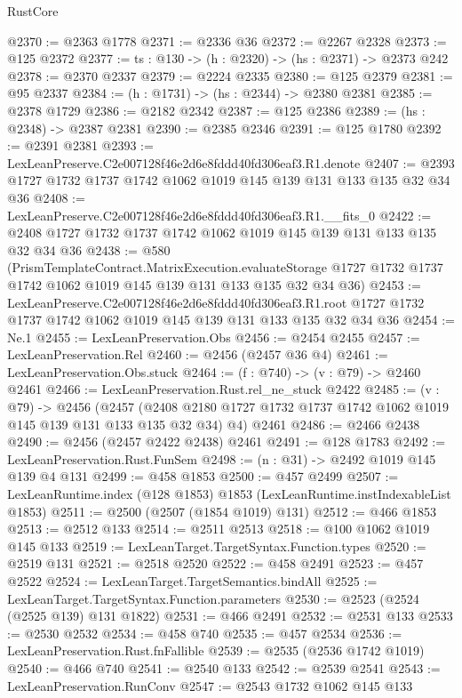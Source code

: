 \begin{lexlean}{RustCore}
\begin{coremodule}
@2370 := @2363 @1778
@2371 := @2336 @36
@2372 := @2267 @2328
@2373 := @125 @2372
@2377 := {ts : @130} -> (h : @2320) -> (hs : @2371) -> @2373 @242
@2378 := @2370 @2337
@2379 := @2224 @2335
@2380 := @125 @2379
@2381 := @95 @2337
@2384 := (h : @1731) -> (hs : @2344) -> @2380 @2381
@2385 := @2378 @1729
@2386 := @2182 @2342
@2387 := @125 @2386
@2389 := (hs : @2348) -> @2387 @2381
@2390 := @2385 @2346
@2391 := @125 @1780
@2392 := @2391 @2381
@2393 := LexLeanPreserve.C2e007128f46e2d6e8fddd40fd306eaf3.R1.denote
@2407 := @2393 @1727 @1732 @1737 @1742 @1062 @1019 @145 @139 @131 @133 @135 @32 @34 @36
@2408 := LexLeanPreserve.C2e007128f46e2d6e8fddd40fd306eaf3.R1.__fits_0
@2422 := @2408 @1727 @1732 @1737 @1742 @1062 @1019 @145 @139 @131 @133 @135 @32 @34 @36
@2438 := @580
    (PrismTemplateContract.MatrixExecution.evaluateStorage
      @1727
      @1732
      @1737
      @1742
      @1062
      @1019
      @145
      @139
      @131
      @133
      @135
      @32
      @34
      @36)
@2453 := LexLeanPreserve.C2e007128f46e2d6e8fddd40fd306eaf3.R1.root
    @1727
    @1732
    @1737
    @1742
    @1062
    @1019
    @145
    @139
    @131
    @133
    @135
    @32
    @34
    @36
@2454 := Ne.{1}
@2455 := LexLeanPreservation.Obs
@2456 := @2454 @2455
@2457 := LexLeanPreservation.Rel
@2460 := @2456 (@2457 @36 @4)
@2461 := LexLeanPreservation.Obs.stuck
@2464 := (f : @740) -> (v : @79) -> @2460 @2461
@2466 := LexLeanPreservation.Rust.rel_ne_stuck @2422
@2485 := (v : @79) ->
  @2456
    (@2457 (@2408 @2180 @1727 @1732 @1737 @1742 @1062 @1019 @145 @139 @131 @133 @135 @32 @34) @4)
    @2461
@2486 := @2466 @2438
@2490 := @2456 (@2457 @2422 @2438) @2461
@2491 := @128 @1783
@2492 := LexLeanPreservation.Rust.FunSem
@2498 := (n : @31) -> @2492 @1019 @145 @139 @4 @131
@2499 := @458 @1853
@2500 := @457 @2499
@2507 := LexLeanRuntime.index (@128 @1853) @1853 (LexLeanRuntime.instIndexableList @1853)
@2511 := @2500 (@2507 (@1854 @1019) @131)
@2512 := @466 @1853
@2513 := @2512 @133
@2514 := @2511 @2513
@2518 := @100 @1062 @1019 @145 @133
@2519 := LexLeanTarget.TargetSyntax.Function.types
@2520 := @2519 @131
@2521 := @2518 @2520
@2522 := @458 @2491
@2523 := @457 @2522
@2524 := LexLeanTarget.TargetSemantics.bindAll
@2525 := LexLeanTarget.TargetSyntax.Function.parameters
@2530 := @2523 (@2524 (@2525 @139) @131 @1822)
@2531 := @466 @2491
@2532 := @2531 @133
@2533 := @2530 @2532
@2534 := @458 @740
@2535 := @457 @2534
@2536 := LexLeanPreservation.Rust.fnFallible
@2539 := @2535 (@2536 @1742 @1019)
@2540 := @466 @740
@2541 := @2540 @133
@2542 := @2539 @2541
@2543 := LexLeanPreservation.RunConv
@2547 := @2543 @1732 @1062 @145 @133

\end{coremodule}
\end{lexlean}
